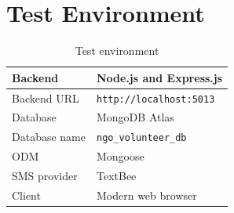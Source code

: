 \documentclass[12pt,a4paper,oneside]{report}
\begin{document}
\section{Test Environment}
\begin{table}[H]
\centering
\caption{Test environment}
\begin{tabularx}{\textwidth}{|p{4cm}|X|}
\hline
Backend & Node.js and Express.js\\ \hline
Backend URL & \texttt{http://localhost:5013}\\ \hline
Database & MongoDB Atlas\\ \hline
Database name & \texttt{ngo\_volunteer\_db}\\ \hline
ODM & Mongoose\\ \hline
SMS provider & TextBee\\ \hline
Client & Modern web browser\\ \hline
\end{tabularx}
\end{table}
\end{document}
